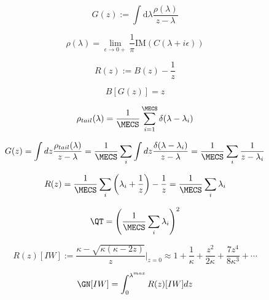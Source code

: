 \begin{equation}
\label{eqn:Gz}
G(z):=\int \mathrm{d}\lambda \frac{\rho(\lambda)}{z-\lambda}
\end{equation}

\begin{equation}
\label{eqn:GzInverse}
\rho(\lambda)=\lim_{\epsilon\rightarrow 0+}\frac{1}{\pi}\mathrm{IM}(C(\lambda+i\epsilon))
\end{equation}

\begin{equation}
\label{eqn:Rz}
R(z):=B(z)-\frac{1}{z}
\end{equation}

\begin{equation}
\label{eqn:GzRelation}
B[G(z)]=z
\end{equation}

\begin{equation}
\label{eqn:spikes_model_0}
\rho_{tail}(\lambda)=\frac{1}{\MECS}\sum_{i=1}^{\MECS}\delta(\lambda-\lambda_{i})
\end{equation}

\begin{equation}
\label{eqn:spikes_model_1}
G(z) = \int dz \dfrac{ \rho_{tail}(\lambda) }{z - \lambda} =
\dfrac{1}{\MECS}\sum_{i} \int dz \dfrac{\delta(\lambda-\lambda_{i}) }{z - \lambda} =
\dfrac{1}{\MECS}\sum_{i} \dfrac{1}{z-\lambda_{i}}
\end{equation}

\begin{equation}
\label{eqn:spikes_model_2}
R(z) =\dfrac{1}{\MECS}\sum_{i}\left(\lambda_{i}+ \dfrac{1}{z}\right) - \dfrac{1}{z}=
\dfrac{1}{\MECS}\sum_{i}\lambda_{i}
\end{equation}

\begin{equation}
\label{eqn:spikes_model_4} 
\QT =\left(\dfrac{1}{\MECS}\sum_{i}\lambda_{i}\right)^{2}
\end{equation}

\begin{equation}
\label{eqn:IW_model_0} 
R(z)[IW] := \dfrac{\kappa -\sqrt{\kappa(\kappa-2z)}}{z}\Big|_{z=0} \approx 1 + \dfrac{1}{\kappa} + \dfrac{z^2}{2\kappa} + \dfrac{7z^4}{8\kappa^3} + \cdots
\end{equation}

\begin{equation}
\label{eqn:IW_model_1} 
\GN[IW] = \int_{0}^{\lambda^{max}} R(z)[IW] dz
\end{equation}

